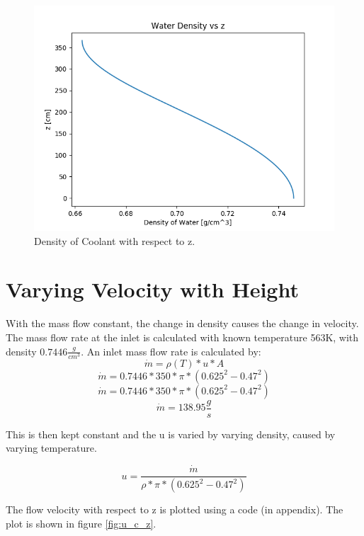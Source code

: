 \documentclass[12pt,letterpaper]{article}
\begin{document}
\begin{figure}[htbp!]
    \begin{center}
        \includegraphics[scale=0.7]{rho_c_z.png}
    \end{center}
    \caption{Density of Coolant with respect to z.}
    \label{fig:rho_c_z}
\end{figure}

\section*{Varying Velocity with Height}
With the mass flow constant, the change in density
causes the change in velocity. The mass flow rate 
at the inlet is calculated with known temperature
563K, with density $0.7446 \frac{g}{cm^3}$.
An inlet mass flow rate is calculated by:
\[ \dot{m} = \rho(T) * u * A \]
\[ \dot{m} = 0.7446 * 350 * \pi * (0.625^2 - 0.47^2) \]
\[ \dot{m} = 0.7446 * 350 * \pi * (0.625^2 - 0.47^2) \]
\[ \dot{m} = 138.95 \frac{g}{s}\]

This is then kept constant and the u is varied by varying
density, caused by varying temperature.

\[ u = \frac{\dot{m}}{\rho * \pi * (0.625^2 - 0.47^2 )}\]

The flow velocity with respect to z is plotted using
a code (in appendix). The plot is shown in figure \ref{fig:u_c_z}.
\end{document}
